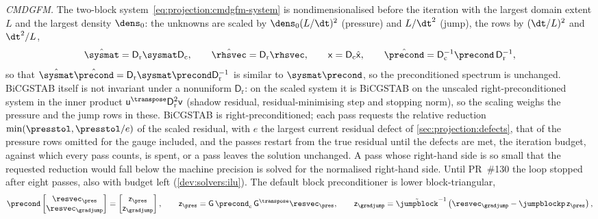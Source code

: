 \emph{CMDGFM.} The two-block system~\cref{eq:projection:cmdgfm-system} is
nondimensionalised before the iteration with the largest domain extent $L$
and the largest density $\dens_0$: the unknowns are scaled by
$\dens_0(L/\dt)^2$ (pressure) and $L/\dt^2$ (jump), the rows by $(\dt/L)^2$
and $\dt^2/L$,
\begin{equation}\label{eq:solvers:cmdgfm-scaling}
  \hat{\sysmat}=\mathsf{D}_{\mathrm{r}}\sysmat\mathsf{D}_{\mathrm{c}},\qquad
  \hat{\rhsvec}=\mathsf{D}_{\mathrm{r}}\rhsvec,\qquad
  \mathsf{x}=\mathsf{D}_{\mathrm{c}}\hat{\mathsf{x}},\qquad
  \hat{\precond}=\mathsf{D}_{\mathrm{c}}^{-1}\precond\,\mathsf{D}_{\mathrm{r}}^{-1},
\end{equation}
so that $\hat{\sysmat}\hat{\precond}=\mathsf{D}_{\mathrm{r}}\sysmat\precond\mathsf{D}_{\mathrm{r}}^{-1}$
is similar to $\sysmat\precond$, so the preconditioned spectrum is unchanged.
BiCGSTAB itself is not invariant under a nonuniform $\mathsf D_{\mathrm r}$: on
the scaled system it is BiCGSTAB on the unscaled right-preconditioned system
in the inner product $\mathsf u^{\transpose}\mathsf D_{\mathrm r}^{2}\mathsf v$
(shadow residual, residual-minimising step and stopping norm), so the scaling
weighs the pressure and the jump rows in these. BiCGSTAB is
right-preconditioned; each pass requests the relative reduction
$\min(\presstol,\presstol/e)$ of the scaled residual, with $e$ the largest
current residual defect of \cref{sec:projection:defects}, that of the
pressure rows omitted for the gauge included, and the passes restart from
the true residual until the defects are met, the iteration budget, against
which every pass counts, is spent, or a pass leaves the solution unchanged.
A pass whose right-hand side is so small that the requested reduction would
fall below the machine precision is solved for the normalised right-hand
side. Until PR~\#130 the loop stopped after eight passes, also with budget
left (\cref{dev:solvers:ilu}). The default block
preconditioner is lower block-triangular,
\begin{equation}\label{eq:solvers:block-preconditioner}
  \precond\begin{bmatrix}\resvec_{\pres}\\ \resvec_{\gradjump}\end{bmatrix}
  =\begin{bmatrix}\mathsf{z}_{\pres}\\ \mathsf{z}_{\gradjump}\end{bmatrix},\qquad
  \mathsf{z}_{\pres}=\mathsf{G}\,\precond_{\mathrm{c}}\,\mathsf{G}^{\transpose}\resvec_{\pres},\qquad
  \mathsf{z}_{\gradjump}=\tilde{\jumpblock}^{-1}\roundpar{\resvec_{\gradjump}-\jumpblockp\,\mathsf{z}_{\pres}},
\end{equation}
